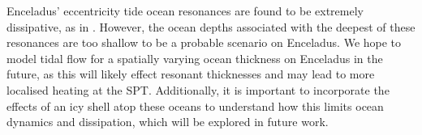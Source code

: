 Enceladus' eccentricity tide ocean resonances are found to be extremely dissipative, as in \citet{tyler2011tidal, matsuyama2014tidal}. However, the ocean depths associated with the deepest of these resonances are too shallow to be a probable scenario on Enceladus. We hope to model tidal flow for a spatially varying ocean thickness on Enceladus in the future, as this will likely effect resonant thicknesses and may lead to more localised heating at the SPT. Additionally, it is important to incorporate the effects of an icy shell atop these oceans to understand how this limits ocean dynamics and dissipation, which will be explored in future work. 